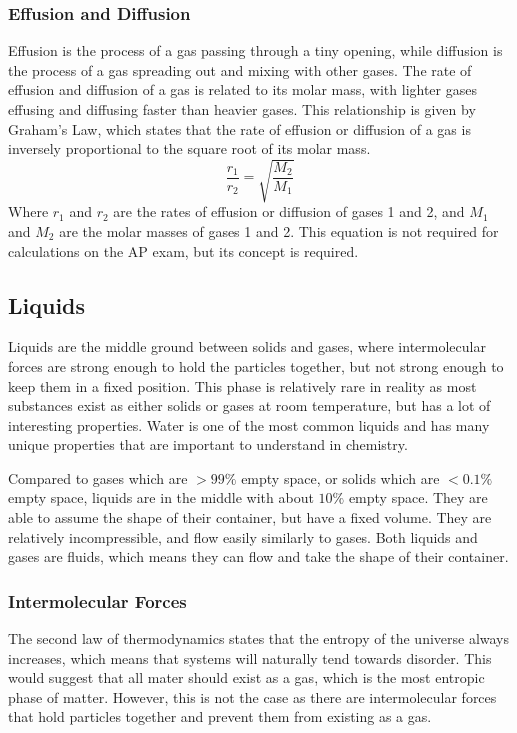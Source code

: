 \subsubsection{Effusion and Diffusion}
Effusion is the process of a gas passing through a tiny opening, while diffusion is the process of a gas spreading out and mixing with other gases. The rate of effusion and diffusion of a gas is related to its molar mass, with lighter gases effusing and diffusing faster than heavier gases.
This relationship is given by Graham's Law, which states that the rate of effusion or diffusion of a gas is inversely proportional to the square root of its molar mass.
\begin{equation}\label{eq:graham}
    \frac{r_1}{r_2} = \sqrt{\frac{M_2}{M_1}}
\end{equation}
Where $r_1$ and $r_2$ are the rates of effusion or diffusion of gases 1 and 2, and $M_1$ and $M_2$ are the molar masses of gases 1 and 2. This equation is not required for calculations on the AP exam, but its concept is required.
\subsection{Liquids}
Liquids are the middle ground between solids and gases, where intermolecular forces are strong enough to hold the particles together, but not strong enough to keep them in a fixed position. This phase is relatively rare in reality as most substances exist as either solids or gases at room temperature, but has a lot of interesting properties. Water is one of the most common liquids and has many unique properties that are important to understand in chemistry. 

Compared to gases which are $>99\%$ empty space, or solids which are $<0.1\%$ empty space, liquids are in the middle with about $10\%$ empty space. They are able to assume the shape of their container, but have a fixed volume. They are relatively incompressible, and flow easily similarly to gases. Both liquids and gases are fluids, which means they can flow and take the shape of their container. 
\subsubsection{Intermolecular Forces}
The second law of thermodynamics states that the entropy of the universe always increases, which means that systems will naturally tend towards disorder. This would suggest that all mater should exist as a gas, which is the most entropic phase of matter. However, this is not the case as there are intermolecular forces that hold particles together and prevent them from existing as a gas. 

